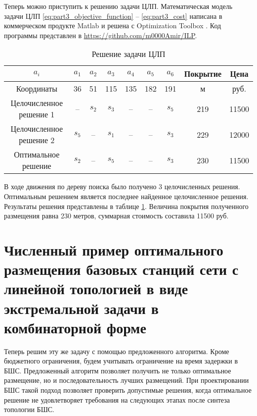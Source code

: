 Теперь можно приступить к решению задачи ЦЛП. Математическая модель задачи ЦЛП \cref{eq:part3_objective_function} -- \cref{eq:part3_cost} написана в коммерческом продукте Matlab и решена с Optimization Toolbox \cite{optimization_toolbox}. Код программы представлен в \url{https://github.com/m0000Amir/ILP}.
 



\begin{table}[h!]\tiny\centering
  \begin{tabular}{|c||c|c|c|c|c|c||c|c|}\hline
    $a_i$ & $a_1$ &  $a_2$ & $a_3$ & $a_4$ & $a_5$ & $a_6$   & Покрытие & Цена \\ \hline 
    Координаты & 36 & 51 & 115 & 135 & 182 & 191 & м & руб.\\ \hline \hline
    Целочисленное решение 1 & --  & $s_2$ & $s_3$ & -- & -- & $s_5$ & 219 & 11500\\ 
    Целочисленное решение 2 & $s_5$ & -- & $s_1$ & -- & -- & $s_3$ & 229 & 12000\\
    Оптимальное решение & $s_2$ & -- & $s_5$ & -- & -- & $s_3$ & 230 & 11500 \\ \hline
\end{tabular}\caption{Решение задачи ЦЛП}\label{tab:part4_ilp_solution}
\end{table}

В ходе движения по дереву поиска было получено 3 целочисленных решения. Оптимальным решением является последнее найденное целочисленное решения. Результаты решения представлены в таблице \cref{tab:part4_ilp_solution}. Величина покрытия полученного размещения равна 230 метров, суммарная стоимость составила 11500 руб.



\FloatBarrier
\section{Численный пример оптимального размещения базовых станций сети с линейной топологией в виде экстремальной задачи в комбинаторной форме}\label{part4:bnb_solution}

Теперь решим эту же задачу с помощью предложенного алгоритма. Кроме бюджетного ограничения, будем учитывать ограничение на время задержки в БШС. Предложенный алгоритм позволяет получить не только оптимальное размещение, но и последовательность лучших размещений. При проектировании БШС такой подход позволяет проверить допустимые решения, когда оптимальное решение не удовлетворяет требования на следующих этапах после синтеза топологии БШС.

